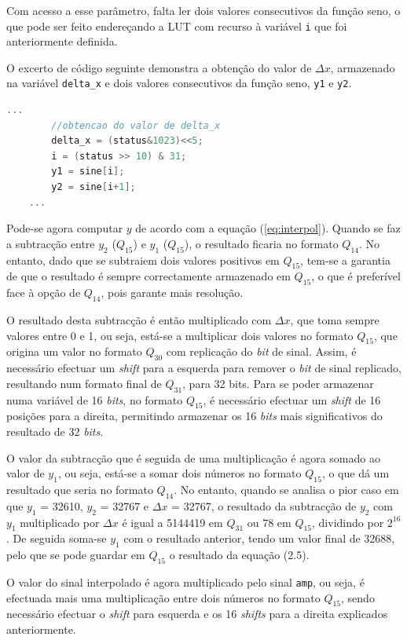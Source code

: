 \documentclass[11pt]{article}
\numberwithin{equation}{section}
\begin{document}
Com acesso a esse parâmetro, falta ler dois valores consecutivos da função seno, o que pode ser feito endereçando a LUT com recurso à variável \texttt{i} que foi anteriormente definida.

O excerto de código seguinte demonstra a obtenção do valor de $\Delta x$, armazenado na variável \texttt{delta\_x} e dois valores consecutivos da função seno, \texttt{y1} e \texttt{y2}.

\begin{lstlisting}[language=C]
	...
		//obtencao do valor de delta_x
		delta_x = (status&1023)<<5;
		i = (status >> 10) & 31;
		y1 = sine[i];
		y2 = sine[i+1];
	...
\end{lstlisting}

Pode-se agora computar $y$ de acordo com a equação (\ref{eq:interpol}). Quando se faz a subtracção entre $y_2$ ($Q_{15}$) e $y_1$ ($Q_{15}$), o resultado ficaria no formato $Q_{14}$. No entanto, dado que se subtraiem dois valores positivos em $Q_{15}$, tem-se a garantia de que o resultado é sempre correctamente armazenado em $Q_{15}$, o que é preferível face à opção de $Q_{14}$, pois garante mais resolução. 

O resultado desta subtracção é então multiplicado com $\Delta x$, que toma sempre valores entre 0 e 1, ou seja, está-se a multiplicar dois valores no formato $Q_{15}$, que origina um valor no formato $Q_{30}$ com replicação do \textit{bit} de sinal. Assim, é necessário efectuar um \textit{shift} para a esquerda para remover o \textit{bit} de sinal replicado, resultando num formato final de $Q_{31}$, para 32 bits. Para se poder armazenar numa variável de 16 \textit{bits}, no formato $Q_{15}$, é necessário efectuar um \textit{shift} de 16 posições para a direita, permitindo armazenar os 16 \textit{bits} mais significativos do resultado de 32 \textit{bits}.

O valor da subtracção que é seguida de uma multiplicação é agora somado ao valor de $y_1$, ou seja, está-se a somar dois números no formato $Q_{15}$, o que dá um resultado que seria no formato $Q_{14}$. No entanto, quando se analisa o pior caso em que $y_1$ = 32610, $y_2$ = 32767 e $\Delta x$ = 32767, o resultado da subtracção de $y_2$ com $y_1$ multiplicado por $\Delta x$ é igual a 5144419 em $Q_{31}$ ou 78 em $Q_{15}$, dividindo por $2^{16}$. De seguida soma-se $y_1$ com o resultado anterior, tendo um valor final de 32688, pelo que se pode guardar em $Q_{15}$ o resultado da equação (2.5).

O valor do sinal interpolado é agora multiplicado pelo sinal \texttt{amp}, ou seja, é efectuada mais uma multiplicação entre dois números no formato $Q_{15}$, sendo necessário efectuar o \textit{shift} para esquerda e os 16 \textit{shifts} para a direita explicados anteriormente.
\end{document}
